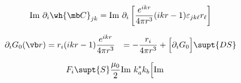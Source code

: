 \begin{align*}
 \text{Im } \partial_i \wh{\mb C}_{jk}
&= \text{Im }
   \partial_i\left[ \frac{e^{ikr}}{4\pi r^3}(ikr-1)\varepsilon_{jk\ell}r_\ell\right]
\\
\end{align*}

\begin{align*}
\partial_i G_0(\vb r)
   &= r_i(ikr-1)\frac{e^{ikr}}{4\pi r^3}
   &= -\frac{r_i}{4\pi r^3} + \Big[\partial_i G_0\Big]\supt{DS}
\end{align*}

\begin{align*}
 F_i\supt{S}
 &\frac{\mu_0}{2} \text{Im }{k_a^* k_b}\Big[\text{Im }
\end{align*}
